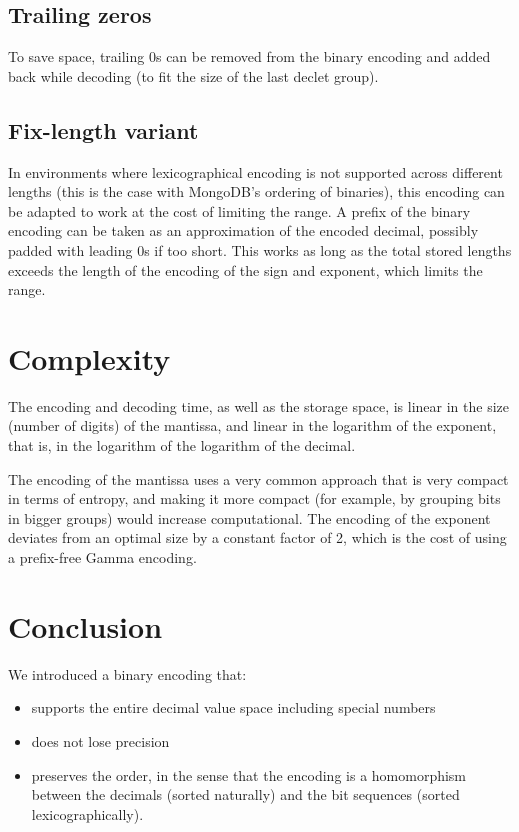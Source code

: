 \documentclass{acm_proc_article-sp}
\begin{document}
\subsection{Trailing zeros}

To save space, trailing 0s can be removed from the binary encoding and added back while decoding (to fit the size of the last declet group).

\subsection{Fix-length variant}

In environments where lexicographical encoding is not supported across different lengths (this is the case with MongoDB's ordering of binaries), this encoding can be adapted to work at the cost of limiting the range.
A prefix of the binary encoding can be taken as an approximation of the encoded decimal, possibly padded with leading 0s if too short. This works as long as the total stored lengths exceeds the length of the encoding of the sign and exponent, which limits the range.

\section{Complexity}

The encoding and decoding time, as well as the storage space, is linear in the size (number of digits) of the mantissa, and linear in the logarithm of the exponent, that is, in the logarithm of the logarithm of the decimal.

The encoding of the mantissa uses a very common approach that is very compact in terms of entropy, and making it more compact (for example, by grouping bits in bigger groups) would increase computational. The encoding of the exponent deviates from an optimal size by a constant factor of 2, which is the cost of using a prefix-free Gamma encoding.

\section{Conclusion}

We introduced a binary encoding that:
\begin{itemize}
\item supports the entire decimal value space including special numbers
\item does not lose precision
\item preserves the order, in the sense that the encoding is a homomorphism between the decimals (sorted naturally) and the bit sequences (sorted lexicographically).
\end{itemize}
\end{document}

